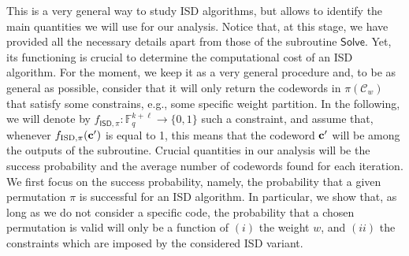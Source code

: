 This is a very general way to study ISD algorithms, but allows to identify the main quantities we will use for our analysis.
Notice that, at this stage, we have provided all the necessary details apart from those of the subroutine $\mathsf{Solve}$.
Yet, its functioning is crucial to determine the computational cost of an ISD algorithm.
For the moment, we keep it as a very general procedure and, to be as general as possible, consider that it will only return the codewords in $\pi(\mathscr C_w)$ that satisfy some constrains, e.g., some specific weight partition.
In the following, we will denote by $f_{\mathsf{ISD}, \pi}: \mathbb F_q^{k+\ell} \longrightarrow \{0 , 1\}$ such a constraint, and assume that, whenever $f_{\text{ISD}, \pi}(\mathbf c')$ is equal to 1, this means that the codeword $\mathbf c'$ will be among the outputs of the subroutine.
Crucial quantities in our analysis will be the success probability and the average number of codewords found for each iteration. We first focus on the success probability, namely, the probability that a given permutation $\pi$ is successful for an ISD algorithm. In particular, we show that, as long as we do not consider a specific code, the probability that a chosen permutation is valid will only be a function of $(i)$ the weight $w$, and $(ii)$ the constraints which are imposed by the considered ISD variant.


